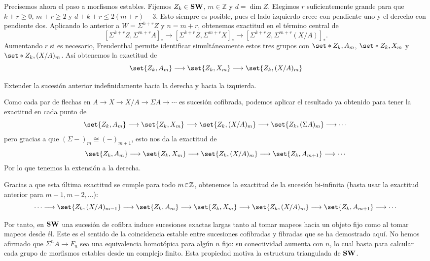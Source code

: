 Precisemos ahora el paso a morfismos estables. Fijemos $Z_k\in\mathbf{SW}$, $m\in\mathbb Z$ y $d=\dim Z$. Elegimos $r$ suficientemente grande para que $k+r\geq0$, $m+r\geq2$ y $d+k+r\leq2(m+r)-3$. Esto siempre es posible, pues el lado izquierdo crece con pendiente uno y el derecho con pendiente dos. Aplicando lo anterior a $W=\Sigma^{k+r}Z$ y $n=m+r$, obtenemos exactitud en el término central de
\[
[\Sigma^{k+r}Z,\Sigma^{m+r}A]_*
\longrightarrow[\Sigma^{k+r}Z,\Sigma^{m+r}X]_*
\longrightarrow[\Sigma^{k+r}Z,\Sigma^{m+r}(X/A)]_*.
\]
Aumentando $r$ si es necesario, Freudenthal permite identificar simultáneamente estos tres grupos con $\set*{Z_k,A_m}$, $\set*{Z_k,X_m}$ y $\set*{Z_k,(X/A)_m}$. Así obtenemos la exactitud de
\[
\set{Z_k,A_m}
\longrightarrow\set{Z_k,X_m}
\longrightarrow\set{Z_k,(X/A)_m}
\]
\begin{ejer}
Extender la sucesión anterior indefinidamente hacia la derecha y hacia la izquierda.
\end{ejer}
\begin{sol}
Como cada par de flechas en $A \to X \to X/A \to \Sigma A\to\cdots$ es sucesión cofibrada, podemos aplicar el resultado ya obtenido para tener la exactitud en cada punto de
\[
\set{Z_k,A_m} \longrightarrow
\set{Z_k,X_m} \longrightarrow
\set{Z_k,(X/A)_m} \longrightarrow
\set{Z_k,(\Sigma A)_m} \longrightarrow\cdots
\]
pero gracias a que $(\Sigma-)_m \cong(-)_{m+1}$, esto nos da la exactitud de
\[
\set{Z_k,A_m} \longrightarrow
\set{Z_k,X_m} \longrightarrow
\set{Z_k,(X/A)_m} \longrightarrow
\set{Z_k,A_{m+1}} \longrightarrow\cdots
\]
Por lo que tenemos la extensión a la derecha.\par
Gracias a que esta última exactitud se cumple para todo $m\en\mathbb Z$, obtenemos la exactitud de la sucesión bi-infinita (basta usar la exactitud anterior para $m-1,m-2,\dots$):
\[
\cdots \longrightarrow
\set{Z_k,(X/A)_{m-1}} \longrightarrow
\set{Z_k,A_m} \longrightarrow
\set{Z_k,X_m} \longrightarrow
\set{Z_k,(X/A)_m} \longrightarrow
\set{Z_k,A_{m+1}} \longrightarrow\cdots
\]
\end{sol}

Por tanto, en $\mathbf{SW}$ una sucesión de cofibra induce sucesiones exactas largas tanto al tomar mapeos hacia un objeto fijo como al tomar mapeos desde él. Este es el sentido de la coincidencia estable entre sucesiones cofibradas y fibradas que se ha demostrado aquí. No hemos afirmado que $\Sigma^nA\to F_n$ sea una equivalencia homotópica para algún $n$ fijo: su conectividad aumenta con $n$, lo cual basta para calcular cada grupo de morfismos estables desde un complejo finito. Esta propiedad motiva la estructura triangulada de $\mathbf{SW}$.

